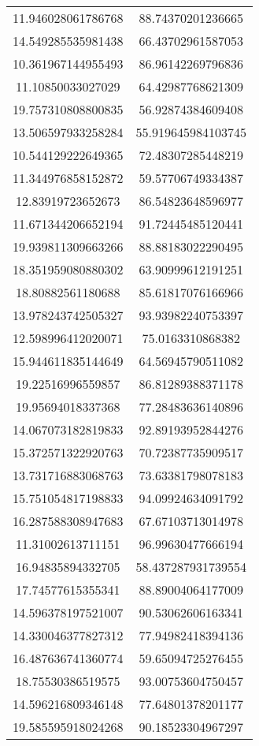 \begin{table}
\begin{tabular}{cc}
11.946028061786768 & 88.74370201236665 \\
14.549285535981438 & 66.43702961587053 \\
10.361967144955493 & 86.96142269796836 \\
11.10850033027029 & 64.42987768621309 \\
19.757310808800835 & 56.92874384609408 \\
13.506597933258284 & 55.919645984103745 \\
10.544129222649365 & 72.48307285448219 \\
11.344976858152872 & 59.57706749334387 \\
12.83919723652673 & 86.54823648596977 \\
11.671344206652194 & 91.72445485120441 \\
19.939811309663266 & 88.88183022290495 \\
18.351959080880302 & 63.90999612191251 \\
18.80882561180688 & 85.61817076166966 \\
13.978243742505327 & 93.93982240753397 \\
12.598996412020071 & 75.0163310868382 \\
15.944611835144649 & 64.56945790511082 \\
19.22516996559857 & 86.81289388371178 \\
19.95694018337368 & 77.28483636140896 \\
14.067073182819833 & 92.89193952844276 \\
15.372571322920763 & 70.72387735909517 \\
13.731716883068763 & 73.63381798078183 \\
15.751054817198833 & 94.09924634091792 \\
16.287588308947683 & 67.67103713014978 \\
11.31002613711151 & 96.99630477666194 \\
16.94835894332705 & 58.437287931739554 \\
17.74577615355341 & 88.89004064177009 \\
14.596378197521007 & 90.53062606163341 \\
14.330046377827312 & 77.94982418394136 \\
16.487636741360774 & 59.65094725276455 \\
18.75530386519575 & 93.00753604750457 \\
14.596216809346148 & 77.64801378201177 \\
19.585595918024268 & 90.18523304967297 \\

\end{tabular}
\end{table}
